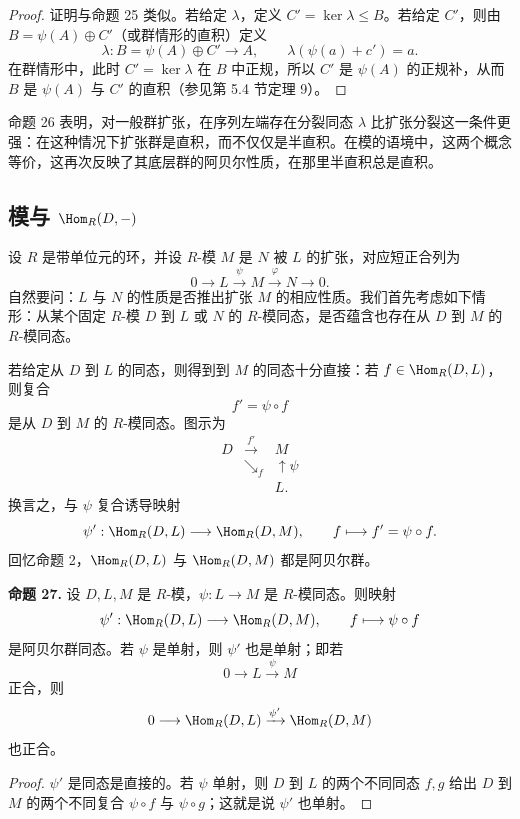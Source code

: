 \begin{proof}
证明与命题 25 类似。若给定 $\lambda$，定义 $C'=\ker\lambda\leq B$。若给定 $C'$，则由 $B=\psi(A)\oplus C'$（或群情形的直积）定义
\[
\lambda:B=\psi(A)\oplus C'\longrightarrow A,
\qquad \lambda(\psi(a)+c')=a.
\]
在群情形中，此时 $C'=\ker\lambda$ 在 $B$ 中正规，所以 $C'$ 是 $\psi(A)$ 的正规补，从而 $B$ 是 $\psi(A)$ 与 $C'$ 的直积（参见第 5.4 节定理 9）。
\end{proof}

命题 26 表明，对一般群扩张，在序列左端存在分裂同态 $\lambda$ 比扩张分裂这一条件更强：在这种情况下扩张群是直积，而不仅仅是半直积。在模的语境中，这两个概念等价，这再次反映了其底层群的阿贝尔性质，在那里半直积总是直积。

\subsection*{模与 $\Hom_R(D,-)$}

设 $R$ 是带单位元的环，并设 $R$-模 $M$ 是 $N$ 被 $L$ 的扩张，对应短正合列为
\[
0\longrightarrow L\xrightarrow{\psi}M\xrightarrow{\varphi}N\longrightarrow0.
\]
自然要问：$L$ 与 $N$ 的性质是否推出扩张 $M$ 的相应性质。我们首先考虑如下情形：从某个固定 $R$-模 $D$ 到 $L$ 或 $N$ 的 $R$-模同态，是否蕴含也存在从 $D$ 到 $M$ 的 $R$-模同态。

若给定从 $D$ 到 $L$ 的同态，则得到到 $M$ 的同态十分直接：若 $f\in\Hom_R(D,L)$，则复合
\[
f'=\psi\circ f
\]
是从 $D$ 到 $M$ 的 $R$-模同态。图示为
\[
\begin{array}{ccc}
D&\xrightarrow{f'}&M\\
&\searrow_f&\uparrow\psi\\[-2mm]
&&L.
\end{array}
\]
换言之，与 $\psi$ 复合诱导映射
\[
\psi':\Hom_R(D,L)\longrightarrow\Hom_R(D,M),
\qquad f\longmapsto f'=\psi\circ f.
\]
回忆命题 2，$\Hom_R(D,L)$ 与 $\Hom_R(D,M)$ 都是阿贝尔群。

\noindent\textbf{命题 27.} 设 $D,L,M$ 是 $R$-模，$\psi:L\to M$ 是 $R$-模同态。则映射
\[
\psi':\Hom_R(D,L)\longrightarrow\Hom_R(D,M),
\qquad f\longmapsto \psi\circ f
\]
是阿贝尔群同态。若 $\psi$ 是单射，则 $\psi'$ 也是单射；即若
\[
0\longrightarrow L\xrightarrow{\psi}M
\]
正合，则
\[
0\longrightarrow \Hom_R(D,L)\xrightarrow{\psi'}\Hom_R(D,M)
\]
也正合。

\begin{proof}
$\psi'$ 是同态是直接的。若 $\psi$ 单射，则 $D$ 到 $L$ 的两个不同同态 $f,g$ 给出 $D$ 到 $M$ 的两个不同复合 $\psi\circ f$ 与 $\psi\circ g$；这就是说 $\psi'$ 也单射。
\end{proof}

